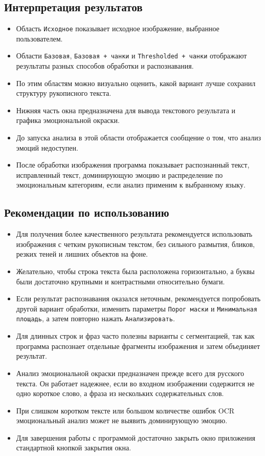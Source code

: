 \documentclass[12pt,a4paper]{article}
\begin{document}
\subsection{Интерпретация результатов}

\begin{itemize}
    \item Область \texttt{Исходное} показывает исходное изображение, выбранное пользователем.
    \item Области \texttt{Базовая}, \texttt{Базовая + чанки} и
    \texttt{Thresholded + чанки} отображают результаты разных способов обработки
    и распознавания.
    \item По этим областям можно визуально оценить, какой вариант лучше сохранил
    структуру рукописного текста.
    \item Нижняя часть окна предназначена для вывода текстового результата и графика
    эмоциональной окраски.
    \item До запуска анализа в этой области отображается сообщение о том, что анализ
    эмоций недоступен.
    \item После обработки изображения программа показывает распознанный текст,
    исправленный текст, доминирующую эмоцию и распределение по эмоциональным категориям,
    если анализ применим к выбранному языку.
\end{itemize}

\subsection{Рекомендации по использованию}

\begin{itemize}
    \item Для получения более качественного результата рекомендуется использовать
    изображения с четким рукописным текстом, без сильного размытия, бликов, резких
    теней и лишних объектов на фоне.
    \item Желательно, чтобы строка текста была расположена горизонтально, а буквы
    были достаточно крупными и контрастными относительно бумаги.
    \item Если результат распознавания оказался неточным, рекомендуется попробовать
    другой вариант обработки, изменить параметры \texttt{Порог маски} и
    \texttt{Минимальная площадь}, а затем повторно нажать \texttt{Анализировать}.
    \item Для длинных строк и фраз часто полезны варианты с сегментацией, так как
    программа распознает отдельные фрагменты изображения и затем объединяет результат.
    \item Анализ эмоциональной окраски предназначен прежде всего для русского текста.
    Он работает надежнее, если во входном изображении содержится не одно короткое слово,
    а фраза из нескольких содержательных слов.
    \item При слишком коротком тексте или большом количестве ошибок OCR эмоциональный
    анализ может не выявить доминирующую эмоцию.
    \item Для завершения работы с программой достаточно закрыть окно приложения
    стандартной кнопкой закрытия окна.
\end{itemize}
\end{document}

